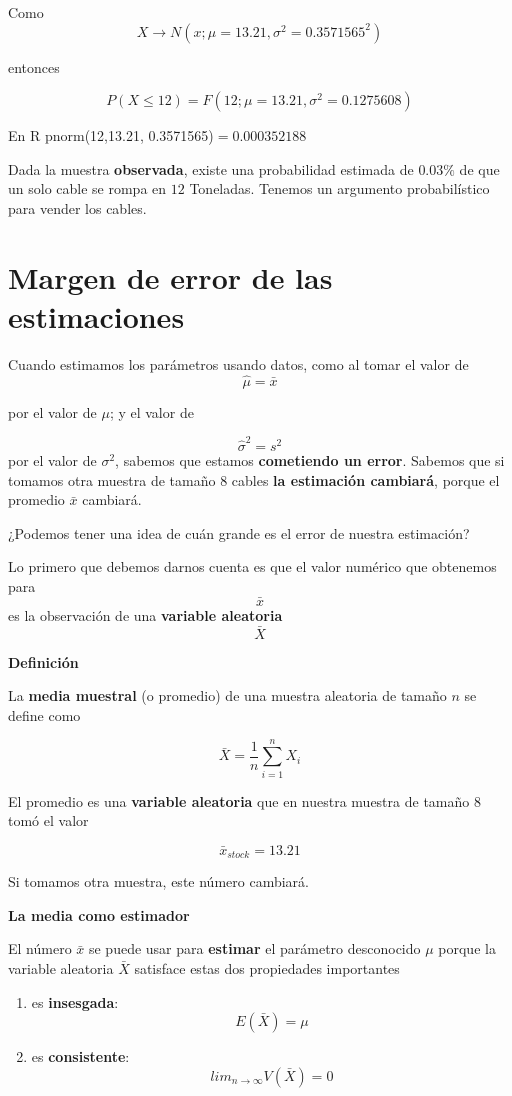 \documentclass[
]{book}
\providecommand{\tightlist}{%
  \setlength{\itemsep}{0pt}\setlength{\parskip}{0pt}}
\begin{document}
Como \[X \rightarrow N(x; \mu=13.21, \sigma^2=0.3571565^2)\]

entonces

\[P(X \leq 12)= F(12; \mu=13.21, \sigma^2=0.1275608)\]

En R pnorm(12,13.21, 0.3571565)\(=0.000352188\)

Dada la muestra \textbf{observada}, existe una probabilidad estimada de \(0.03\%\) de que un solo cable se rompa en \(12\) Toneladas. Tenemos un argumento probabilístico para vender los cables.

\hypertarget{margen-de-error-de-las-estimaciones}{%
\section{Margen de error de las estimaciones}\label{margen-de-error-de-las-estimaciones}}

Cuando estimamos los parámetros usando datos, como al tomar el valor de \[\hat{\mu}=\bar{x}\]

por el valor de \(\mu\); y el valor de

\[\hat{\sigma}^2=s^2\]
por el valor de \(\sigma^2\), sabemos que estamos \textbf{cometiendo un error}. Sabemos que si tomamos otra muestra de tamaño \(8\) cables \textbf{la estimación cambiará}, porque el promedio \(\bar{x}\) cambiará.

¿Podemos tener una idea de cuán grande es el error de nuestra estimación?

Lo primero que debemos darnos cuenta es que el valor numérico que obtenemos para \[\bar{x}\] es la observación de una \textbf{variable aleatoria} \[\bar{X}\]

\textbf{Definición}

La \textbf{media muestral} (o promedio) de una muestra aleatoria de tamaño \(n\) se define como

\[\bar{X}=\frac{1}{n}\sum_{i=1}^n X_i\]

El promedio es una \textbf{variable aleatoria} que en nuestra muestra de tamaño \(8\) tomó el valor

\[\bar{x}_{stock}=13.21\]

Si tomamos otra muestra, este número cambiará.

\textbf{La media como estimador}

El número \(\bar{x}\) se puede usar para \textbf{estimar} el parámetro desconocido \(\mu\) porque la variable aleatoria \(\bar{X}\) satisface estas dos propiedades importantes

\begin{enumerate}
\def\labelenumi{\arabic{enumi})}
\tightlist
\item
  es \textbf{insesgada}: \[E(\bar{X})=\mu\]
\item
  es \textbf{consistente}: \[lim_{n \rightarrow \infty} V(\bar{X}) = 0\]
\end{enumerate}
\end{document}

